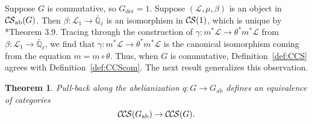 \documentclass[10pt]{amsart}
\theoremstyle{plain}
\newtheorem{theorem}{Theorem}[section]
\theoremstyle{definition}
\newcommand{\EE}{\mathbb{\bar Q}_\ell}
\newcommand{\der}{_{\operatorname{der}}}
\newcommand{\ab}{_{\operatorname{ab}}}
\newcommand{\cs}[1]{{\mathcal{#1}}}
\newcommand{\CS}{{\mathcal{C\hskip-0.8pt S}}}
\newcommand{\CCS}{{\mathcal{C\hskip-.8pt C\hskip-0.8pt S}}}
\begin{document}
Suppose $G$ is commutative, so $G\der = 1$. 
Suppose $(\cs{L},\mu,\beta)$ is an object in $\CS\ab(G)$.
Then $\beta : \cs{L}_1\to \EE$ is an isomorphism in $\CS(1)$, which is unique by \cite{cunningham-roe:13a}*{Theorem 3.9}.
Tracing through the construction of $\gamma : m^*\cs{L} \to \theta^*m^*\cs{L}$ from $\beta : \cs{L}_1\to \EE$, we find
that $\gamma : m^*\cs{L} \to \theta^*m^*\cs{L}$ is the canonical isomorphism coming from the equation $m = m \circ \theta$. 
Thus, when $G$ is commutative, Definition~\ref{def:CCS} agrees with Definition~\ref{def:CCScom}.
The next result generalizes this observation.


\begin{theorem}\label{thm:Gab}
Pull-back along the abelianization $q : G \to G\ab$
defines an equivalence of categories
\[
\CCS(G\ab) \to \CCS(G).
\]
\end{theorem}
\end{document}
